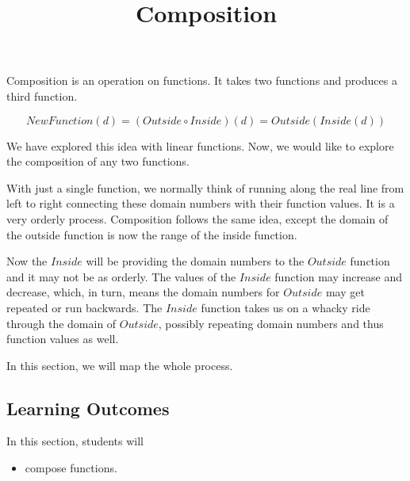 \documentclass{ximera}
\title{Composition}
\begin{document}
\begin{abstract}
\end{abstract}
\maketitle













Composition is an operation on functions.  It takes two functions and produces a third function.


\[  NewFunction(d) = (Outside \circ Inside)(d) = Outside(Inside(d))    \]



We have explored this idea with linear functions.  Now, we would like to explore the composition of any two functions.






With just a single function, we normally think of running along the real line from left to right connecting these domain numbers with their function values.  It is a very orderly process.  Composition follows the same idea, except the domain of the outside function is now the range of the inside function.

Now the $Inside$ will be providing the domain numbers to the $Outside$ function and it may not be as orderly. The values of the $Inside$ function may increase and decrease, which, in turn, means the domain numbers for $Outside$ may get repeated or run backwards.   The $Inside$ function takes us on a whacky ride through the domain of $Outside$, possibly repeating domain numbers and thus function values as well.


In this section, we will map the whole process.










\subsection{Learning Outcomes}





\begin{sectionOutcomes}
In this section, students will 

\begin{itemize}
\item compose functions.
\end{itemize}
\end{sectionOutcomes}
\end{document}
